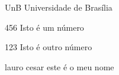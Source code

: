 \begin{siglas}
  \item[UnB] Universidade de Brasília
  \item[456] Isto é um número
  \item[123] Isto é outro número
  \item[lauro cesar] este é o meu nome
\end{siglas}
